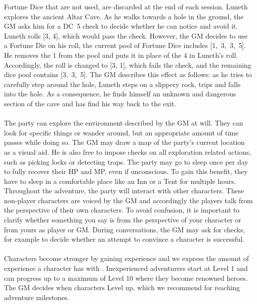 Fortune Dice that are not used, are discarded at the end of each session.
%
\ofpar
%
{
	Luneth explores the ancient Altar Cave. 
	As he walks towards a hole in the ground, the GM asks him for a DC~5 check to decide whether he can notice and avoid it.
	Luneth rolls [3, 4], which would pass the check.
	However, the GM decides to use a Fortune Die on his roll, the current pool of Fortune Dice includes \mbox{[1, 3, 3, 5]}.
	He removes the 1 from the pool and puts it in place of the 4 in Luneth's roll.  
	Accordingly, the roll is changed to [3, 1], which fails the check, and the remaining dice pool contains \mbox{[3, 3, 5]}.
	The GM describes this effect as follows: as he tries to carefully step around the hole, Luneth steps on a slippery rock, trips and falls into the hole.
	As a consequence, he finds himself an unknown and dangerous section of the cave and has find his way back to the exit.
}
%
\ofpar
%
\\\\
%
The party can explore the environment described by the GM at will.
They can look for specific things or wander around, but an appropriate amount of time passes while doing so.
The GM may draw a map of the party's current location as a visual aid. 
He is also free to impose checks on all exploration related actions, such as picking locks or detecting traps.
The party may go to sleep once per day to fully recover their HP and MP, even if unconscious.
To gain this benefit, they have to sleep in a comfortable place like an Inn or a Tent for multiple hours.
Throughout the adventure, the party will interact with other characters.
These non-player characters are voiced by the GM and accordingly the players talk from the perspective of their own characters.
To avoid confusion, it is important to clarify whether something you say is from the perspective of your character or from yours as player or GM.
During conversations, the GM may ask for checks, for example to decide whether an attempt to convince a character is successful.
%
\vfill
%
\\\\
%
Characters become stronger by gaining experience and we express the amount of experience a character has with .
Inexperienced adventurers start at Level 1 and can progress up to a maximum of Level 10 where they become renowned heroes. 
The GM decides when characters Level up, which we recommend for reaching adventure milestones.
